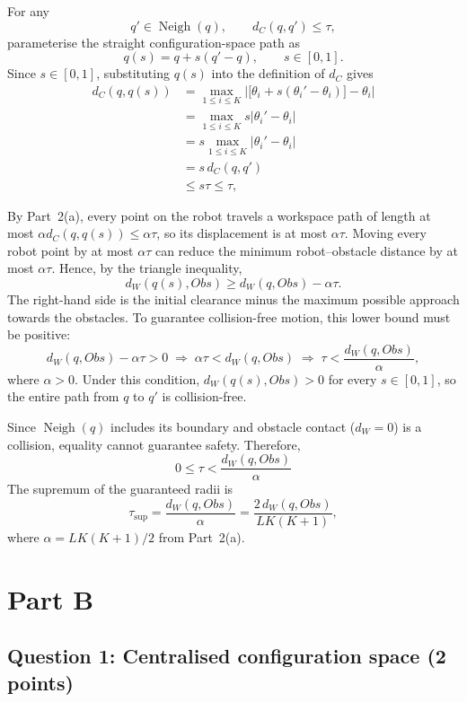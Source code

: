 \documentclass[11pt,a4paper]{article}
\begin{document}
For any
\[
  q'\in\operatorname{Neigh}(q),
  \qquad
  d_C(q,q')\leq\tau,
\]
parameterise the straight configuration-space path as
\[
  q(s)=q+s(q'-q),
  \qquad s\in[0,1].
\]
Since $s\in[0,1]$, substituting $q(s)$ into the definition of $d_C$ gives
\[
  \begin{aligned}
    d_C(q,q(s))
    &=\max_{1\leq i\leq K}
      \left|\bigl[\theta_i+s({\theta_i}'-\theta_i)\bigr]-\theta_i\right|\\
    &=\max_{1\leq i\leq K}s|{\theta_i}'-\theta_i|\\
    &=s\max_{1\leq i\leq K}|{\theta_i}'-\theta_i|\\
    &=s\,d_C(q,q')\\
    &\leq s\tau\leq\tau,
  \end{aligned}
\]

\noindent
By Part~2(a), every point on the robot travels a workspace path of length at
most $\alpha d_C(q,q(s))\leq\alpha\tau$, so its displacement is at most
$\alpha\tau$.  Moving every robot point by at most $\alpha\tau$ can reduce
the minimum robot--obstacle distance by at most $\alpha\tau$.  Hence, by the
triangle inequality,
\[
  d_W(q(s),Obs)
  \geq d_W(q,Obs)-\alpha\tau.
\]
The right-hand side is the initial clearance minus the maximum possible
approach towards the obstacles.  To guarantee collision-free motion, this
lower bound must be positive:
\[
  d_W(q,Obs)-\alpha\tau>0
  \;\Longrightarrow\;
  \alpha\tau<d_W(q,Obs)
  \;\Longrightarrow\;
  \tau<\frac{d_W(q,Obs)}{\alpha},
\]
where $\alpha>0$.  Under this condition, $d_W(q(s),Obs)>0$ for every
$s\in[0,1]$, so the entire path from $q$ to $q'$ is collision-free.

\noindent
Since $\operatorname{Neigh}(q)$ includes its boundary and obstacle contact
($d_W=0$) is a collision, equality cannot guarantee safety.  Therefore,
\[
  \boxed{
    0\leq\tau<
    \frac{d_W(q,Obs)}{\alpha}
  }
\]
The supremum of the guaranteed radii is
\[
  \boxed{
    \tau_{\mathrm{sup}}
    =
    \frac{d_W(q,Obs)}{\alpha}
    =
    \frac{2\,d_W(q,Obs)}{LK(K+1)}
  },
\]
where $\alpha=LK(K+1)/2$ from Part~2(a).

\clearpage
\section*{Part B}

\subsection*{Question 1: Centralised configuration space (2 points)}
\end{document}
